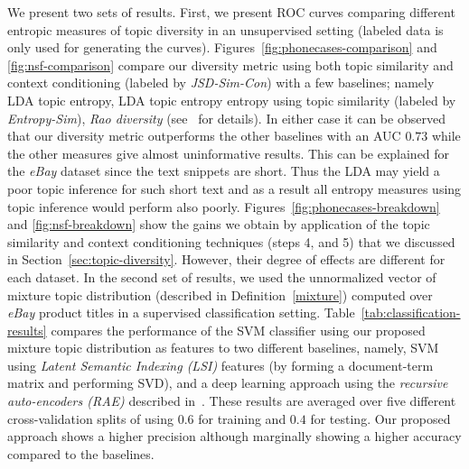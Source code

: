 \documentclass{article} %
\begin{document}
We present two sets of results. First, we present
ROC curves comparing different entropic measures of topic diversity in an unsupervised setting 
(labeled data is only used for generating the curves). Figures~\ref{fig:phonecases-comparison} and \ref{fig:nsf-comparison}
compare our diversity metric using both topic similarity and context conditioning (labeled by {\em JSD-Sim-Con}) with a few baselines; namely LDA topic entropy, LDA topic entropy entropy using topic similarity (labeled by {\em Entropy-Sim}), {\em Rao diversity} (see~\cite{bache:2013} for details). In either case it can be observed that our diversity metric outperforms the other baselines with an AUC $0.73$ while the other measures give almost uninformative results. This can be explained for the {\em eBay} dataset since the text snippets are short. Thus the LDA may yield a poor topic inference for such short text and as a result all entropy measures using topic inference would perform also poorly. Figures~\ref{fig:phonecases-breakdown} and \ref{fig:nsf-breakdown} show the gains we obtain by application of the topic similarity and context conditioning techniques (steps 4, and 5) that we discussed in Section~\ref{sec:topic-diversity}. However, their degree of effects are different for each
dataset.  In the second set of results, we used the unnormalized vector of mixture topic
distribution (described in Definition~\ref{mixture}) computed over {\em eBay} product titles in a supervised classification setting. Table~\ref{tab:classification-results} compares the performance of the SVM classifier using our proposed mixture topic distribution as features to two different baselines, namely, SVM using {\em Latent Semantic Indexing (LSI)} features (by forming a document-term matrix and performing SVD), and a deep learning approach using the {\em recursive auto-encoders (RAE)} described in~\cite{Socher:2011:SRA:2145432.2145450}. These results are averaged over five different cross-validation splits of using $0.6$ for training and $0.4$ for testing. Our proposed approach shows a higher precision although marginally showing a higher accuracy compared to the baselines.
\end{document}
